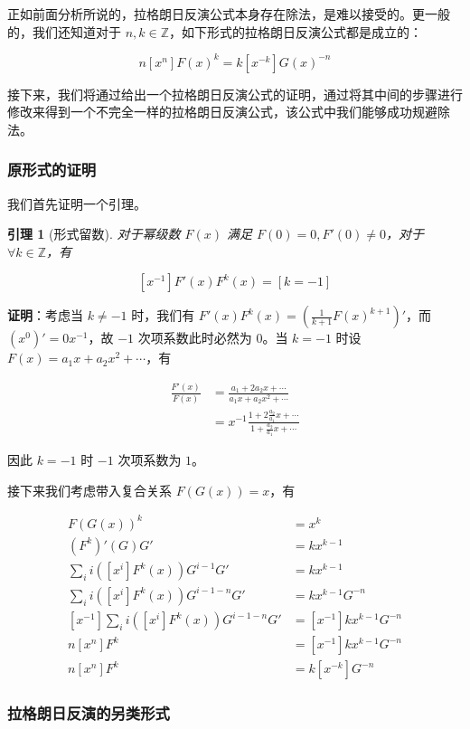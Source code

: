 \documentclass[12pt]{ctexart}
\newtheorem{Lem}{\hspace{2em}引理}
\begin{document}
正如前面分析所说的，拉格朗日反演公式本身存在除法，是难以接受的。更一般的，我们还知道对于 $n,k\in \mathbb Z$，如下形式的拉格朗日反演公式都是成立的：

$$
n[x^n]F(x)^k = k[x^{-k}]G(x)^{-n}
$$

接下来，我们将通过给出一个拉格朗日反演公式的证明，通过将其中间的步骤进行修改来得到一个不完全一样的拉格朗日反演公式，该公式中我们能够成功规避除法。

\subsubsection{原形式的证明}

我们首先证明一个引理。

\begin{Lem}[形式留数]
对于幂级数 $F(x)$ 满足 $F(0)=0, F'(0)\neq0$，对于 $\forall k\in \mathbb Z$，有

$$
[x^{-1}]F'(x)F^k(x)=[k=-1]
$$

\end{Lem}

\textbf{证明}：考虑当 $k\neq -1$ 时，我们有 $F'(x)F^k(x)=(\frac 1{k+1} F(x)^{k+1})'$，而 $(x^0)'=0x^{-1}$，故 $-1$ 次项系数此时必然为 $0$。当 $k=-1$ 时设 $F(x) = a_1 x + a_2 x^2 + \cdots$，有

\begin{align*}
\frac{F'(x)}{F(x)} &= \frac{a_1 + 2a_2x + \cdots}{a_1 x + a_2 x^2 + \cdots}\\
&= x^{-1} \frac{1 + 2\frac{a_2}{a_1} x + \cdots}{1 + \frac{a_2}{a_1} x + \cdots}
\end{align*}

因此 $k=-1$ 时 $-1$ 次项系数为 $1$。

接下来我们考虑带入复合关系 $F(G(x))=x$，有

\begin{align*}
F(G(x))^k &= x^k\\
(F^k)'(G)G' &= kx^{k-1}\\
\sum_{i} i([x^i] F^k(x)) G^{i-1}G' &= kx^{k-1}\\
\sum_{i} i([x^i] F^k(x)) G^{i-1-n}G' &= kx^{k-1}G^{-n}\\ 
[x^{-1}]\sum_{i} i([x^i] F^k(x)) G^{i-1-n}G' &= [x^{-1}]kx^{k-1}G^{-n}\\ 
n[x^n] F^k &= [x^{-1}]kx^{k-1}G^{-n}\\ 
n[x^n] F^k &= k[x^{-k}]G^{-n}
\end{align*}

\subsubsection{拉格朗日反演的另类形式}
\end{document}
